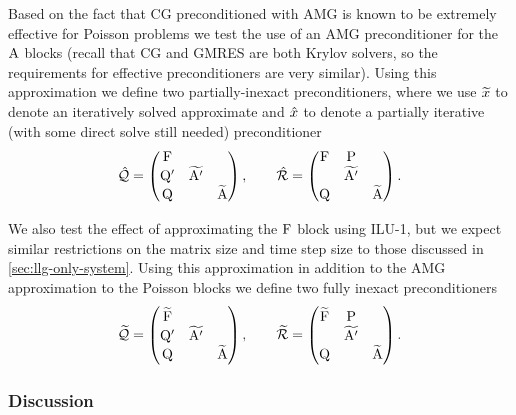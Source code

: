 Based on the fact that CG preconditioned with AMG is known to be extremely effective for Poisson problems we test the use of an AMG preconditioner for the $\mathrm{A}$ blocks (recall that CG and GMRES are both Krylov solvers, so the requirements for effective preconditioners are very similar).
Using this approximation we define two partially-inexact preconditioners, where we use $\widetilde{x}$ to denote an iteratively solved approximate and $\hat{x}$ to denote a partially iterative (\ie with some direct solve still needed) preconditioner
\begin{equation}
  \hat{\mathcal{Q}} =
  \begin{pmatrix}
    \mathrm{F}       &           &  \\
    \mathrm{Q}'       & \widetilde{\mathrm{A}'} &   \\
    \mathrm{Q}       &           &   \widetilde{\mathrm{A}}
  \end{pmatrix},
  \qquad
  \hat{\mathcal{R}} =
  \begin{pmatrix}
    \mathrm{F}       & \mathrm{P}       &  \\
    & \widetilde{\mathrm{A}'} &   \\
    \mathrm{Q}       &           &  \widetilde{\mathrm{A}}
  \end{pmatrix}.
  \label{eq:ms-block-prec-drop-p}
\end{equation}

We also test the effect of approximating the $\mathrm{F}$ block using ILU-1, but we expect similar restrictions on the matrix size and time step size to those discussed in \cref{sec:llg-only-system}.
Using this approximation in addition to the AMG approximation to the Poisson blocks we define two fully inexact preconditioners
\begin{equation}
  \widetilde{\mathcal{Q}} =
  \begin{pmatrix}
    \widetilde{\mathrm{F}} &           &  \\
    \mathrm{Q}'       & \widetilde{\mathrm{A}'} &   \\
    \mathrm{Q}       &           &   \widetilde{\mathrm{A}}
  \end{pmatrix},
  \qquad
  \widetilde{\mathcal{R}} =
  \begin{pmatrix}
   \widetilde{\mathrm{F}}       & \mathrm{P}       &  \\
    & \widetilde{\mathrm{A}'} &   \\
    \mathrm{Q}       &           &  \widetilde{\mathrm{A}}
  \end{pmatrix}.
  \label{eq:ms-block-prec-drop-p}
\end{equation}


\subsubsection{Discussion}

